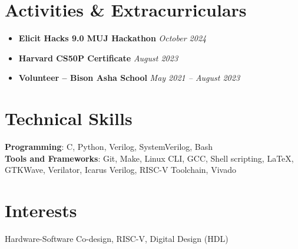 \documentclass[letterpaper,11pt]{article}
\begin{document}
\section{Activities \& Extracurriculars}
\begin{itemize}[leftmargin=*, itemsep=1pt]
  \item \textbf{Elicit Hacks 9.0 MUJ Hackathon} \hfill \textit{October 2024}
  \item \textbf{Harvard CS50P Certificate} \hfill \textit{August 2023}
  \item \textbf{Volunteer – Bison Asha School} \hfill \textit{May 2021 -- August 2023}
\end{itemize}

\section{Technical Skills}
\begin{itemize}[leftmargin=0.15in, label={}]
  \small{\item{
    \textbf{Programming}{: C, Python, Verilog, SystemVerilog, Bash} \\
    \textbf{Tools and Frameworks}{: Git, Make, Linux CLI, GCC, Shell scripting, LaTeX, GTKWave, Verilator, Icarus Verilog, RISC-V Toolchain, Vivado}
  }}
\end{itemize}

\section{Interests}
\begin{itemize}[leftmargin=0.15in, label={}]
  \small{\item{
    Hardware-Software Co-design, RISC-V, Digital Design (HDL)
  }}
\end{itemize}
\end{document}
